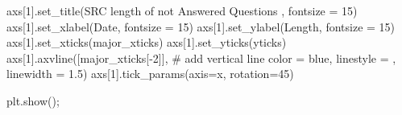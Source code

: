 \documentclass[
  letterpaper,
  DIV=11,
  numbers=noendperiod]{scrartcl}
\newenvironment{Shaded}{\begin{snugshade}}{\end{snugshade}}
\newcommand{\CommentTok}[1]{\textcolor[rgb]{0.37,0.37,0.37}{#1}}
\newcommand{\DecValTok}[1]{\textcolor[rgb]{0.68,0.00,0.00}{#1}}
\newcommand{\FloatTok}[1]{\textcolor[rgb]{0.68,0.00,0.00}{#1}}
\newcommand{\NormalTok}[1]{\textcolor[rgb]{0.00,0.23,0.31}{#1}}
\newcommand{\OperatorTok}[1]{\textcolor[rgb]{0.37,0.37,0.37}{#1}}
\newcommand{\StringTok}[1]{\textcolor[rgb]{0.13,0.47,0.30}{#1}}
\begin{document}
\begin{Shaded}
\begin{Highlighting}[]
\NormalTok{axs[}\DecValTok{1}\NormalTok{].set\_title(}\StringTok{\textquotesingle{}SRC length of not Answered Questions \textquotesingle{}}\NormalTok{, fontsize }\OperatorTok{=} \DecValTok{15}\NormalTok{)}
\NormalTok{axs[}\DecValTok{1}\NormalTok{].set\_xlabel(}\StringTok{\textquotesingle{}Date\textquotesingle{}}\NormalTok{, fontsize }\OperatorTok{=} \DecValTok{15}\NormalTok{)}
\NormalTok{axs[}\DecValTok{1}\NormalTok{].set\_ylabel(}\StringTok{\textquotesingle{}Length\textquotesingle{}}\NormalTok{, fontsize }\OperatorTok{=} \DecValTok{15}\NormalTok{)}
\NormalTok{axs[}\DecValTok{1}\NormalTok{].set\_xticks(major\_xticks)}
\NormalTok{axs[}\DecValTok{1}\NormalTok{].set\_yticks(yticks)}
\NormalTok{axs[}\DecValTok{1}\NormalTok{].axvline([major\_xticks[}\OperatorTok{{-}}\DecValTok{2}\NormalTok{]], }\CommentTok{\# add vertical line}
\NormalTok{           color }\OperatorTok{=} \StringTok{\textquotesingle{}blue\textquotesingle{}}\NormalTok{,}
\NormalTok{           linestyle }\OperatorTok{=} \StringTok{\textquotesingle{}{-}{-}\textquotesingle{}}\NormalTok{,}
\NormalTok{           linewidth }\OperatorTok{=} \FloatTok{1.5}\NormalTok{)}
\NormalTok{axs[}\DecValTok{1}\NormalTok{].tick\_params(axis}\OperatorTok{=}\StringTok{\textquotesingle{}x\textquotesingle{}}\NormalTok{, rotation}\OperatorTok{=}\DecValTok{45}\NormalTok{)}

\NormalTok{plt.show()}\OperatorTok{;}
\end{Highlighting}
\end{Shaded}
\end{document}
